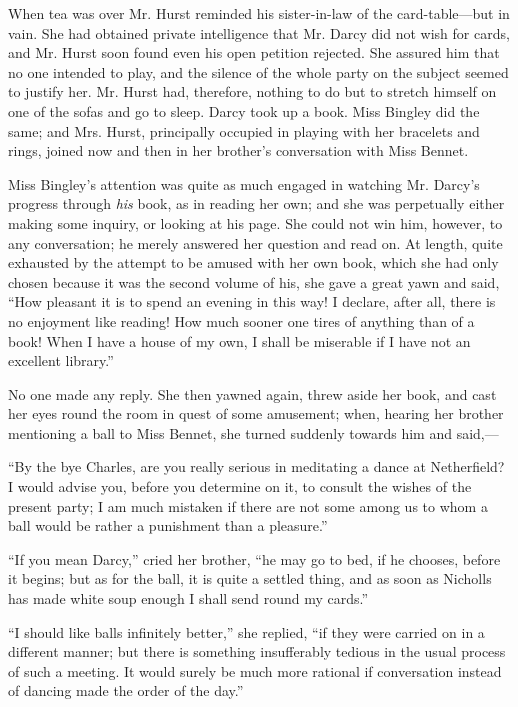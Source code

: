When tea was over Mr. Hurst reminded his sister-in-law of the card-table---but in vain. She had obtained private intelligence that Mr. Darcy did not wish for cards, and Mr. Hurst soon found even his open petition rejected. She assured him that no one intended to play, and the silence of the whole party on the subject seemed to justify her. Mr. Hurst had, therefore, nothing to do but to stretch himself on one of the sofas and go to sleep. Darcy took up a book. Miss Bingley did the same; and Mrs. Hurst, principally occupied in playing with her bracelets and rings, joined now and then in her brother's conversation with Miss Bennet.

Miss Bingley's attention was quite as much engaged in watching Mr. Darcy's progress through \textit{his} book, as in reading her own; and she was perpetually either making some inquiry, or looking at his page. She could not win him, however, to any conversation; he merely answered her question and read on. At length, quite exhausted by the attempt to be amused with her own book, which she had only chosen because it was the second volume of his, she gave a great yawn and said, ``How pleasant it is to spend an evening in this way! I declare, after all, there is no enjoyment like reading! How much sooner one tires of anything than of a book! When I have a house of my own, I shall be miserable if I have not an excellent library.''

No one made any reply. She then yawned again, threw aside her book, and cast her eyes round the room in quest of some amusement; when, hearing her brother mentioning a ball to Miss Bennet, she turned suddenly towards him and said,---

``By the bye Charles, are you really serious in meditating a dance at Netherfield? I would advise you, before you determine on it, to consult the wishes of the present party; I am much mistaken if there are not some among us to whom a ball would be rather a punishment than a pleasure.''

``If you mean Darcy,'' cried her brother, ``he may go to bed, if he chooses, before it begins; but as for the ball, it is quite a settled thing, and as soon as Nicholls has made white soup enough I shall send round my cards.''

``I should like balls infinitely better,'' she replied, ``if they were carried on in a different manner; but there is something insufferably tedious in the usual process of such a meeting. It would surely be much more rational if conversation instead of dancing made the order of the day.''

